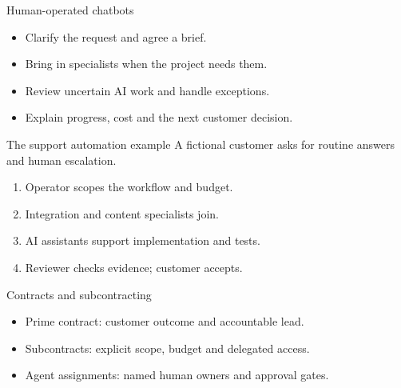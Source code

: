 \documentclass[aspectratio=169,20pt]{beamer}
\begin{document}
\begin{frame}{Human-operated chatbots}
\begin{itemize}
\item Clarify the request and agree a brief.
\item Bring in specialists when the project needs them.
\item Review uncertain AI work and handle exceptions.
\item Explain progress, cost and the next customer decision.
\end{itemize}
\end{frame}
\begin{frame}{The support automation example}
{\fontsize{30}{38}\selectfont A fictional customer asks for routine answers and human escalation.}\par\vspace{5mm}
\begin{enumerate}
\item Operator scopes the workflow and budget.
\item Integration and content specialists join.
\item AI assistants support implementation and tests.
\item Reviewer checks evidence; customer accepts.
\end{enumerate}
\end{frame}
\begin{frame}{Contracts and subcontracting}
\begin{itemize}
\item Prime contract: customer outcome and accountable lead.
\item Subcontracts: explicit scope, budget and delegated access.
\item Agent assignments: named human owners and approval gates.
\end{itemize}
\end{frame}
\end{document}
